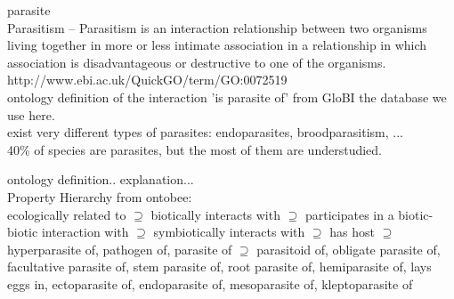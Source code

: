     \begin{definition} parasite \\
      Parasitism – Parasitism is an interaction relationship between two organisms living together in 
        more or less intimate association in a relationship in which association is disadvantageous or 
        destructive to one of the organisms. \\
      http://www.ebi.ac.uk/QuickGO/term/GO:0072519 \\
      ontology definition of the interaction 'is parasite of' from GloBI the database we use here. \\
      exist very different types of parasites: endoparasites, broodparasitism, ... \\
      40\% of species are parasites, but the most of them are understudied. \cite{Windsor1998}
      
      ontology definition.. explanation... \\
      Property Hierarchy from ontobee: \\
      ecologically related to $\supseteq$ biotically interacts with $\supseteq$ participates in a 
        biotic-biotic interaction with $\supseteq$ symbiotically interacts with $\supseteq$ has host 
        $\supseteq$ hyperparasite of, pathogen of, parasite of $\supseteq$ parasitoid of, obligate 
        parasite of, facultative parasite of, stem parasite of, root parasite of, hemiparasite of, 
        lays eggs in, ectoparasite of, endoparasite of, mesoparasite of, kleptoparasite of
    \end{definition}


